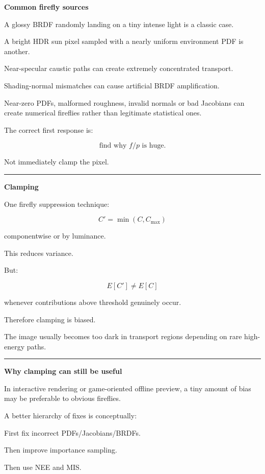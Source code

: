 \textbf{Common firefly sources}

A glossy BRDF randomly landing on a tiny intense light is a classic case.

A bright HDR sun pixel sampled with a nearly uniform environment PDF is another.

Near-specular caustic paths can create extremely concentrated transport.

Shading-normal mismatches can cause artificial BRDF amplification.

Near-zero PDFs, malformed roughness, invalid normals or bad Jacobians can create numerical fireflies rather than legitimate statistical ones.

The correct first response is:

\[
\boxed{
\text{find why }f/p\text{ is huge}.
}
\]

Not immediately clamp the pixel.

\begin{center}\rule{0.5\linewidth}{0.5pt}\end{center}

\textbf{Clamping}

One firefly suppression technique:

\[
C'=
\min(C,C_{\max})
\]

componentwise or by luminance.

This reduces variance.

But:

\[
E[C']\neq E[C]
\]

whenever contributions above threshold genuinely occur.

Therefore clamping is biased.

The image usually becomes too dark in transport regions depending on rare high-energy paths.

\begin{center}\rule{0.5\linewidth}{0.5pt}\end{center}

\textbf{Why clamping can still be useful}

In interactive rendering or game-oriented offline preview, a tiny amount of bias may be preferable to obvious fireflies.

A better hierarchy of fixes is conceptually:

First fix incorrect PDFs/Jacobians/BRDFs.

Then improve importance sampling.

Then use NEE and MIS.

